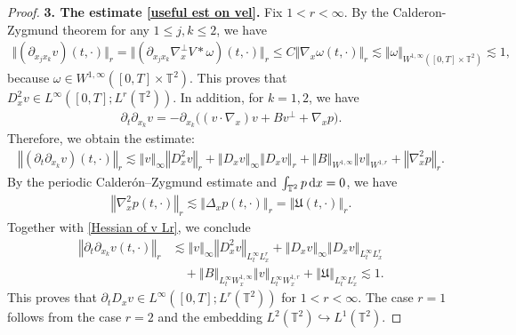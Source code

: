 \documentclass[11pt,reqno]{amsart}
\numberwithin{equation}{section}
\def\dd{{\rm d}}
\begin{document}
\begin{proof}
\medskip
\textbf{3. The estimate \eqref{useful est on vel}. } Fix $1<r<\infty$. By  the Calderon-Zygmund theorem
for any $1\leq j,k\leq 2$, we have
\begin{align}
\big\Vert (\partial_{x_{j}x_{k}}v)(t,\cdot)\big\Vert_{r} 
=\big\Vert (\partial_{x_{j}x_{k}}\nabla_{x}^{\perp}V\ast \omega)(t,\cdot)\big\Vert_{r}
\leq C\big\Vert \nabla_{x}\omega(t,\cdot)\big\Vert_{r}
\lesssim \big\Vert \omega\big\Vert_{W^{1,\infty}([0,T]\times \mathbb{T}^{2})}
\lesssim 1,  \label{Hessian of v Lr} 
\end{align}
because $\omega\in W^{1,\infty}([0,T]\times \mathbb{T}^{2})$. 
This proves that $D^{2}_{x}v\in L^{\infty}([0,T];L^{r}(\mathbb{T}^{2}))$.   
In addition, for $k=1,2$, we have 
\begin{align*}
\partial_{t}\partial_{x_{k}}v=-\partial_{x_{k}}\big((v\cdot\nabla_x)v+Bv^{\perp}+\nabla_{x}p\big).    
\end{align*}
Therefore, we obtain the estimate:  
\begin{align*}
\left\Vert (\partial_{t}\partial_{x_{k}}v)(t,\cdot)\right\Vert_{r}\lesssim
\left\Vert v\right\Vert_\infty\left\Vert D_x^2v\right\Vert_r
+\left\Vert D_xv\right\Vert_\infty\left\Vert D_xv\right\Vert_r
+\left\Vert B\right\Vert_{W^{1,\infty}}\left\Vert v\right\Vert_{W^{1,r}}
+\left\Vert \nabla_x^2p\right\Vert_r.   
\end{align*}
By the periodic Calder\'on--Zygmund estimate and $\int_{\mathbb T^2}p\,\dd x=0$, we have 
\begin{align*}
\left\Vert \nabla^{2}_{x}p(t,\cdot)\right\Vert_{r}\lesssim \left\Vert \Delta_{x} p(t,\cdot)\right\Vert_{r}=\left\Vert \mathfrak{U}(t,\cdot)\right\Vert_{r}.        
\end{align*}
Together with  \eqref{Hessian of v Lr}, we conclude 
\begin{align*}
\left\Vert \partial_{t}\partial_{x_{k}}v(t,\cdot)\right\Vert_{r}
&\lesssim \left\Vert v\right\Vert_{\infty}
\left\Vert D_{x}^{2}v\right\Vert_{L^{\infty}_{t}L^{r}_{x}}
+\left\Vert D_xv\right\Vert_{\infty}
\left\Vert D_xv\right\Vert_{L^\infty_tL^r_x}\\
&\quad+\left\Vert B\right\Vert_{L^{\infty}_{t}W^{1,\infty}_{x}}
\left\Vert v\right\Vert_{L^{\infty}_{t}W^{1,r}_{x}}
+\left\Vert \mathfrak{U}\right\Vert_{L^{\infty}_{t}L^{r}_{x}}\lesssim 1.
\end{align*}
This proves that $\partial_{t}D_{x}v\in L^{\infty}([0,T];L^{r}(\mathbb{T}^{2}))$ for $1<r<\infty$. 
The case $r=1$ follows from the case $r=2$ and the embedding 
$L^2(\mathbb T^2)\hookrightarrow L^1(\mathbb T^2)$.
\end{proof}
\end{document}
